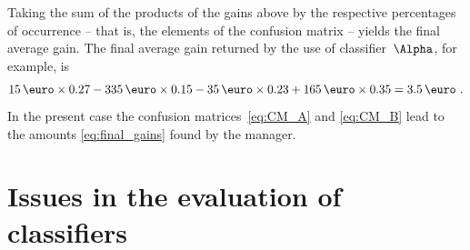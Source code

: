 \documentclass[\ifafour a4paper,12pt,\else a5paper,10pt,\fi%
onecolumn,oneside,article,%
british%
]{memoir}
\theoremstyle{remark}
\theoremstyle{innote}
\renewcommand*{\|}[1][]{\nonscript\:#1\vert\nonscript\:\mathopen{}}
\begin{document}
Taking the sum of the products of the gains above by the respective percentages of occurrence -- that is, the elements of the confusion matrix -- yields the final average gain. The final average gain returned by the use of classifier~$\Alpha$, for example, is
\begin{equation*}
  15\,\text{\texteuro} \times 0.27 
  -335\,\text{\texteuro} \times 0.15 
  -35\,\text{\texteuro} \times 0.23 
  + 165\,\text{\texteuro} \times 0.35 =
  3.5 \,\text{\texteuro} \ .
\end{equation*}
In the present case the confusion matrices~\eqref{eq:CM_A} and \eqref{eq:CM_B} lead to the amounts \eqref{eq:final_gains} found by the manager.





\section{Issues in the evaluation of classifiers}
\label{sec:issues}
\end{document}
